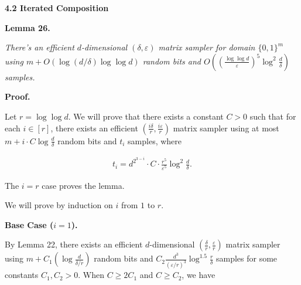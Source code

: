 \par\medskip\noindent\textbf{
4.2 Iterated Composition}\par





\par\medskip\noindent\textbf{
\textbf{Lemma 26}\textbf{.}
}\par



\emph{There’s an efficient $d$-dimensional $(\delta,\varepsilon)$ matrix sampler for domain $\{0,1\}^{m}$ using $m+O(\log(d/\delta)\log\log d)$ random bits and $O((\frac{\log\log d}{\varepsilon})^{5}\log^{2}\frac{d}{\delta})$ samples.}\par






\par\medskip\noindent\textbf{Proof.}\par




Let $r=\log\log d$.
We will prove that there exists a constant $C>0$ such that for each $i\in[r]$, there exists an efficient $\left(\frac{i\delta}{r},\frac{i\varepsilon}{r}\right)$ matrix sampler using at most $m+i\cdot C\log\frac{d}{\delta}$ random bits and $t_{i}$ samples, where\par


\[\begin{gathered}
t_{i}=d^{2^{3-i}}\cdot C\cdot\frac{r^{5}}{\varepsilon^{5}}\log^{2}\frac{d}{\delta}.
\end{gathered}\]


The $i=r$ case proves the lemma.\par




We will prove by induction on $i$ from $1$ to $r$.\par





\par\medskip\noindent\textbf{Base Case ($i=1$).}\par




By Lemma 22, there exists an efficient $d$-dimensional $(\frac{\delta}{r},\frac{\varepsilon}{r})$ matrix sampler using $m+C_{1}(\log\frac{d}{\delta/r})$ random bits and $C_{2}\frac{d^{3}}{(\varepsilon/r)^{3}}\log^{1.5}\frac{r}{\delta}$ samples for some constants $C_{1},C_{2}>0$. When $C\geq 2C_{1}$ and $C\geq C_{2}$, we have\par


